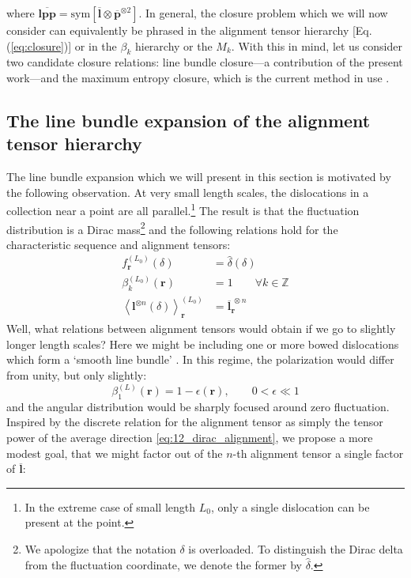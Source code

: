 where $\overline{\boldsymbol{lpp}}= \text{sym}[\overline{\boldsymbol{l}}\otimes \overline{\boldsymbol{p}}^{\otimes 2}]$. In general, the closure problem which we will now consider can equivalently be phrased in the alignment tensor hierarchy [Eq. (\ref{eq:closure})] or in the $\beta_k$ hierarchy or the $M_k$. With this in mind, let us consider two candidate closure relations: line bundle closure---a contribution of the present work---and the maximum entropy closure, which is the current method in use \cite{Monavari2016}.

\subsection{The line bundle expansion of the alignment tensor
hierarchy}

The line bundle expansion which we will present in this section is
motivated by the following observation. At very small length scales, the dislocations in a collection near a point are all parallel.\footnote{In the extreme case of small length $L_0$, only a single dislocation can be present at the point.} The result is
that the fluctuation distribution is a Dirac mass\footnote{We apologize
  that the notation \(\delta\) is overloaded. To distinguish the Dirac
  delta from the fluctuation coordinate, we denote the former by
  \(\hat{\delta}\).} and the following relations hold for the
characteristic sequence and alignment tensors:
\begin{subequations}
\begin{align}
    f_{\boldsymbol{r}}^{\left( L_{0} \right)}(\delta) &= \hat{\delta}(\delta)\\
    \beta_{k}^{\left( L_{0} \right)}\left( \boldsymbol{r} \right) &= 1\qquad \forall k \in \mathbb{Z}\\
    \left\langle \boldsymbol{l}^{\otimes n}(\delta) \right\rangle_{\boldsymbol{r}}^{\left( L_{0} \right)}&=\overline{\boldsymbol{l}}_{\boldsymbol{r}}^{ \ \otimes n}\label{eq:12_dirac_alignment}
\end{align}
\end{subequations}
Well, what relations between alignment tensors would obtain if we go to slightly longer length scales? Here we might be including one or more bowed dislocations which form a `smooth line bundle' \cite{Sedlacek2010,Lin2021}. In this regime, the polarization would differ from unity, but only slightly: 
\begin{equation}
\beta_{1}^{(L)}\left( \boldsymbol{r} \right) = 1 - \epsilon\left( \boldsymbol{r} \right),\qquad 0 < \epsilon \ll 1\end{equation}
and the angular distribution would be sharply focused around zero fluctuation. Inspired by the discrete relation for the alignment tensor as simply the tensor power of the average direction \cref{eq:12_dirac_alignment}, we propose a more modest goal, that we might factor out of the $n$-th alignment tensor a single factor of \(\overline{\boldsymbol{l}}\):

